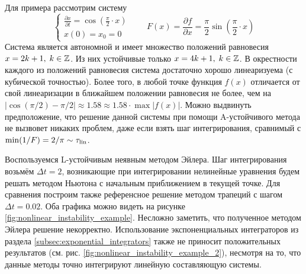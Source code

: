 Для примера рассмотрим систему
%
\begin{equation}
    \label{eq:cosine_system}
    \begin{cases}
        \frac{\partial x}{\partial t} = \cos\left( \frac{\pi}{2} \cdot x \right) \\
        x(0) = x_0 = 0
    \end{cases}
    \qquad
    F(x) = \frac{\partial f}{\partial x} = \frac{\pi}{2} \sin\left( \frac{\pi}{2} \cdot x \right)
\end{equation}
%
%
Система является автономной и имеет множество положений равновесия $ x = 2k + 1, \; k \in \mathbb{Z} $.
Из них устойчивые только $ x = 4k + 1, \; k \in \mathbb{Z} $.
В окрестности каждого из положений равновесия система достаточно хорошо линеаризуема (с кубической точностью).
Более того, в любой точке функция $ f(x) $ отличается от свой линеаризации в ближайшем положении равновесия не более, чем на
$ |\cos(\pi/2) - \pi/2| \approx 1.58 \approx 1.58 \cdot \max |f(x)| $.
Можно выдвинуть предположение, что решение данной системы при помощи A-устойчивого метода не вызвовет никаких проблем,
даже если взять шаг интегрирования, сравнимый с $ \min (1 / F) = 2 / \pi \sim \tau_{\textnormal{lin}} $.

Воспользуемся L-устойчивым неявным методом Эйлера.
Шаг интегрирования возьмём $ \Delta t = 2 $,
возникающие при интегрировании нелинейные уравнения будем решать методом Ньютона с начальным приближением в текущей точке.
Для сравнения построим также референсное решение методом трапеций с шагом $ \Delta t = 0.02 $.
Оба графика можно видеть на рисунке \ref{fig:nonlinear_instability_example}.
Несложно заметить, что полученное методом Эйлера решение некорректно.
Использование экспоненциальных интеграторов из раздела \ref{subsec:exponential_integrators}
также не приносит положительных результатов (см. рис. \ref{fig:nonlinear_instability_example_2}),
несмотря на то, что данные методы точно интегрируют линейную составляющую системы.

